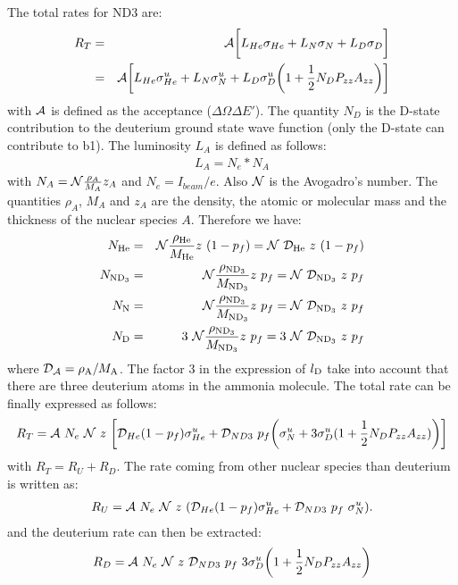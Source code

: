 \documentclass[11pt]{article}
\begin{document}
The total rates for ND3 are:
\begin{eqnarray}
R_T &=& {\cal A} \bigg[ L_{He} \sigma_{He} +  L_N \sigma_N + L_D \sigma_D \bigg] \\
        &=& {\cal A} \bigg[ L_{He} \sigma^u_{He} +  L_{N} \sigma^u_{N} + L_{D} \sigma^u_{D}\bigg(1+\frac{1}{2} N_D P_{zz} A_{zz}\bigg) \bigg]
\label{rt} 
\end{eqnarray}
with ${\cal A}$ is defined as the acceptance ($\Delta \Omega \Delta E'$). The quantity $N_D$ is the D-state contribution to the deuterium ground state wave function (only the D-state can contribute to b1). The luminosity $L_A$ is defined as follows:
\begin{eqnarray}
L_A = N_e * N_A
\label{lumi}
\end{eqnarray}
with $N_A = {\cal N} \frac{\rho_A}{M_A} z_A$ and $N_e = I_{beam} / e$. 
\newline
Also ${\cal N}$ is the Avogadro's number. The quantities $\rho_A$, $M_A$ and $z_A$ are the density, the atomic or molecular mass and the thickness of the  nuclear species $A$. Therefore we have:
\begin{eqnarray}
N_{\rm He} &=& {\cal N} \frac{\rho_{\rm He}}{M_{\rm He}}  z~(1-p_f)  = {\cal N}~{\cal D_{\rm He}} ~z~(1-p_f) \\
N_{\rm ND_3} &=& {\cal N} \frac{\rho_{\rm ND_3}}{M_{\rm ND_3}} z~p_f = {\cal N}~{\cal D_{\rm ND_3}} ~z~p_f \\
N_{\rm N} &=& {\cal N} \frac{\rho_{\rm ND_3}}{M_{\rm ND_3}} z~p_f = {\cal N}~{\cal D_{\rm ND_3}} ~z~p_f \\
N_{\rm D} &=& 3~{\cal N} \frac{\rho_{\rm ND_3}}{M_{\rm ND_3}} z~p_f = 3~{\cal N}~{\cal D_{\rm ND_3}} ~z~p_f \\
\label{la}
\end{eqnarray}
where ${\cal D_A} = \rho_{\rm A}/M_{\rm A}$. The factor 3 in the expression of $l_{\rm D} $ take into account that there are three deuterium atoms in the ammonia molecule.
The total rate can be finally expressed as follows:
\begin{eqnarray}
R_T = {\cal A}~N_e~{\cal N}~z~\bigg[ {\cal D}_{He} (1-p_f) \sigma^u_{He} +  {\cal D}_{ND3}~p_f \bigg(\sigma^u_N + 3 \sigma^u_D (1+\frac{1}{2} N_D P_{zz} A_{zz})\bigg) \bigg]
\label{rtf} 
\end{eqnarray}
with $R_T  = R_U + R_D$. 
The rate coming from other nuclear species than deuterium is written as: 
\begin{eqnarray}
R_U =  {\cal A}~N_e~{\cal N}~z~( {\cal D}_{He} (1-p_f) \sigma^u_{He} +  {\cal D}_{ND3}~p_f~\sigma^u_N).
\label{ruf} 
\end{eqnarray}
and the deuterium rate can then be extracted:
\begin{eqnarray}
R_D = {\cal A}~N_e~{\cal N}~z~ {\cal D}_{ND3}~p_f~ 3 \sigma^u_D \bigg(1+\frac{1}{2} N_D P_{zz} A_{zz}\bigg)
\label{rdf} 
\end{eqnarray}
\end{document}
